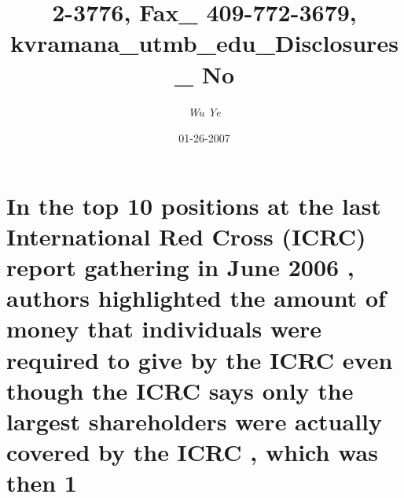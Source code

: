 \documentclass{article}%
\title{2{-}3776, Fax\_ 409{-}772{-}3679, kvramana\_utmb\_edu\_Disclosures\_ No}%
\author{\textit{Wu Ye}}%
\date{01-26-2007}%
\begin{document}
%
\normalsize%
\maketitle%
\section{In the top 10 positions at the last International Red Cross (ICRC) report gathering in June 2006 , authors highlighted the amount of money that individuals were required to give by the ICRC even though the ICRC says only the largest shareholders were actually covered by the ICRC , which was then 1}%
\label{sec:Inthetop10positionsatthelastInternationalRedCross(ICRC)reportgatheringinJune2006,authorshighlightedtheamountofmoneythatindividualswererequiredtogivebytheICRCeventhoughtheICRCsaysonlythelargestshareholderswereactuallycoveredbytheICRC,whichwasthen1}%
\end{document}
